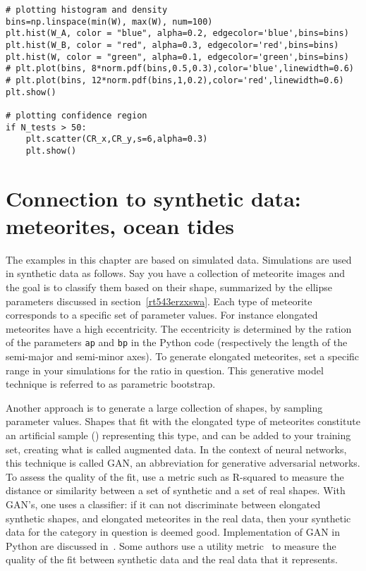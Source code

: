 \documentclass[oneside,10pt]{book}
\begin{document}
\begin{lstlisting}[escapechar=@]
# plotting histogram and density
bins=np.linspace(min(W), max(W), num=100)
plt.hist(W_A, color = "blue", alpha=0.2, edgecolor='blue',bins=bins) 
plt.hist(W_B, color = "red", alpha=0.3, edgecolor='red',bins=bins) 
plt.hist(W, color = "green", alpha=0.1, edgecolor='green',bins=bins) 
# plt.plot(bins, 8*norm.pdf(bins,0.5,0.3),color='blue',linewidth=0.6) 
# plt.plot(bins, 12*norm.pdf(bins,1,0.2),color='red',linewidth=0.6) 
plt.show()

# plotting confidence region
if N_tests > 50:
    plt.scatter(CR_x,CR_y,s=6,alpha=0.3) 
    plt.show() 
\end{lstlisting}

\section{Connection to synthetic data: meteorites, ocean tides}\label{psoriasisy}

The examples in this chapter are based on simulated data. Simulations are used in synthetic data as follows. Say you have a collection of meteorite images and the goal is to classify them based on their shape, summarized by the ellipse parameters discussed in section~\ref{rt543erzxswa}.
Each type of meteorite corresponds to a specific set of parameter values. For instance elongated meteorites have a high eccentricity. The eccentricity is determined by the ration of the parameters \texttt{ap} and \texttt{bp} in the Python code (respectively the length of the semi-major and semi-minor axes). To generate elongated meteorites, set a specific range in your simulations for the ratio in question. This \textcolor{index}{generative model} technique is referred to as \textcolor{index}{parametric bootstrap}. 

Another approach is to generate a large collection of shapes, by sampling parameter values. Shapes that fit with the elongated type of meteorites constitute an artificial sample () representing this type, and can be added to your training set, creating what is called
 \textcolor{index}{augmented data}. In the context of neural networks, this technique is called \textcolor{index}{GAN}, an abbreviation for 
\textcolor{index}{generative adversarial networks}. To assess the quality of the fit, use a metric such as \textcolor{index}{R-squared} to measure the distance or similarity between a set of synthetic and a set of real shapes. With GAN's, one uses a classifier: if it can not discriminate between elongated synthetic shapes, and elongated meteorites in the real data, then your synthetic data for the category in question is deemed good.  Implementation of GAN in Python are discussed in~\cite{ganclouc}. Some authors use a 
utility metric~\cite{utiljrss} to measure the quality of the fit between synthetic data and the real data that it represents. 
\end{document}
